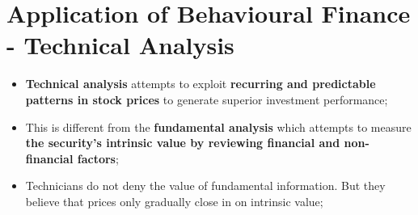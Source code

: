 \documentclass[11pt,a4paper]{report}
\begin{document}
\section{Application of Behavioural Finance - Technical Analysis}
\begin{itemize}
    \item \textbf{Technical analysis} attempts to exploit \textbf{recurring and predictable patterns in stock prices} to generate superior investment performance;
    \item This is different from the \textbf{fundamental analysis} which attempts to measure \textbf{the security's intrinsic value by reviewing financial and non-financial factors};
    \item Technicians do not deny the value of fundamental information. But they believe that prices only gradually close in on intrinsic value;
\end{itemize}
\end{document}
